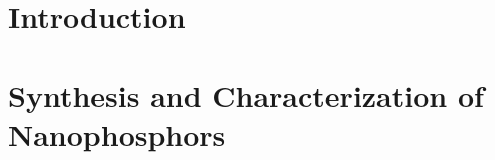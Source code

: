 \documentclass{article}[10pt]
\begin{document}



  \newpage
  \tableofcontents
  \newpage
  \listoffigures

  \newpage
  \section{Introduction}
    

  \newpage
  \section{Synthesis and Characterization of Nanophosphors}
    

  \newpage
  
  
\end{document}
